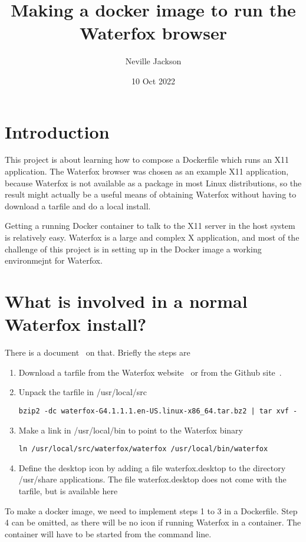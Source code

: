 \documentclass[a4paper]{article}  %
\title{Making a docker image to run the Waterfox browser}
\author{Neville Jackson}
\date{10 Oct 2022}
\begin{document}
 

\maketitle      
\tableofcontents

\section{Introduction} 
This project is about learning how to compose a Dockerfile which runs an X11 application. The Waterfox browser was chosen as an example X11 application, because Waterfox is not available as a package in most Linux distributions, so the result might actually be a useful means of obtaining Waterfox without having to download a tarfile and do a local install. 

Getting a running Docker container to talk to the X11 server in the host system is relatively easy. Waterfox is a large and complex X application, and most of the challenge of this project is in setting up in the Docker image a working environmejnt for Waterfox. 

\section{What is involved in a normal Waterfox install?}
There is a document~\cite{wate:22a} on that.  Briefly the steps are
\begin{enumerate}
\item Download a tarfile from the Waterfox website~\cite{wate:22} or from the Github site~\cite{wate:22b}.
\item  Unpack the tarfile in /usr/local/src
\begin{tcolorbox}
\begin{verbatim}
bzip2 -dc waterfox-G4.1.1.1.en-US.linux-x86_64.tar.bz2 | tar xvf -
\end{verbatim}
\end{tcolorbox}
\item Make a link in /usr/local/bin to point to the Waterfox binary
\begin{tcolorbox}
\begin{verbatim}
ln /usr/local/src/waterfox/waterfox /usr/local/bin/waterfox
\end{verbatim}
\end{tcolorbox}
\item Define the desktop icon by adding a file waterfox.desktop to the directory /usr/share applications. The file waterfox.desktop does not come with the tarfile, but is available here~\cite{wate:22a}
\end{enumerate}
To make a docker image, we need to implement steps 1 to 3 in a Dockerfile. Step 4 can be omitted, as there will be no icon if running Waterfox in a container. The container will have to be started from the command line.
\end{document}

